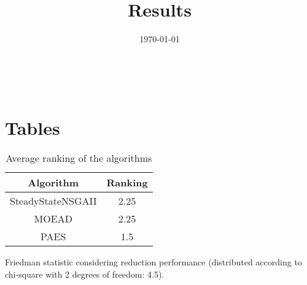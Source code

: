\documentclass{article}
\title{Results}
\author{}
\date{\today}
\begin{document}
\oddsidemargin 0in \topmargin 0in\maketitle
\
\section{Tables}
\begin{table}[!htp]
\centering
\caption{Average ranking of the algorithms}
\begin{tabular}{c|c}
Algorithm&Ranking\\
\hline
SteadyStateNSGAII&2.25\\
MOEAD&2.25\\
PAES&1.5\\
\end{tabular}
\end{table}


Friedman statistic considering reduction performance (distributed according to chi-square with 2 degrees of freedom: 4.5).
\end{document}
